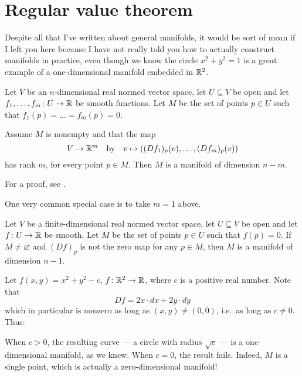 \section{Regular value theorem}
Despite all that I've written about general manifolds,
it would be sort of mean if I left you here
because I have not really told you how to actually construct
manifolds in practice, even though we know the circle
$x^2+y^2=1$ is a great example of a one-dimensional
manifold embedded in $\mathbb R^2$.

\begin{theorem}
	Let $V$ be an $n$-dimensional real normed vector
	space, let $U \subseteq V$ be open
	and let $f_1, \dots, f_m \colon U \to \mathbb R$
	be smooth functions.
	Let $M$ be the set of points $p \in U$
	such that $f_1(p) = \dots = f_m(p) = 0$.

	Assume $M$ is nonempty and that the map
	\[ V \to \mathbb R^m \quad\text{by}\quad
		v \mapsto \left( (Df_1)_p(v), \dots, (Df_m)_p(v) \right) \]
	has rank $m$, for every point $p \in M$.
	Then $M$ is a manifold of dimension $n-m$.
\end{theorem}
For a proof, see \cite[Theorem 6.3]{ref:manifolds}.

One very common special case is to take $m = 1$ above.
\begin{corollary}
	Let $V$ be a finite-dimensional real normed vector
	space, let $U \subseteq V$ be open
	and let $f \colon U \to \mathbb R$ be smooth.
	Let $M$ be the set of points $p \in U$
	such that $f(p) = 0$.
	If $M \neq \varnothing$ and
	$(Df)_p$ is not the zero map for any $p \in M$,
	then $M$ is a manifold of dimension $n-1$.
\end{corollary}

\begin{example}
	[The circle $x^2+y^2-c=0$]
	Let $f(x,y) = x^2+y^2 - c$, $f \colon \mathbb R^2 \to \mathbb R$,
	where $c$ is a positive real number.
	Note that
	\[ Df = 2x \cdot dx + 2y \cdot dy \]
	which in particular is nonzero
	as long as $(x,y) \neq (0,0)$, i.e.\ as long as $c \neq 0$.
	Thus:
	\begin{itemize}
		\ii When $c > 0$, the resulting curve ---
		a circle with radius $\sqrt c$ ---
		is a one-dimensional manifold, as we knew.
		\ii When $c = 0$, the result fails.
		Indeed, $M$ is a single point,
		which is actually a zero-dimensional manifold!
	\end{itemize}
\end{example}


